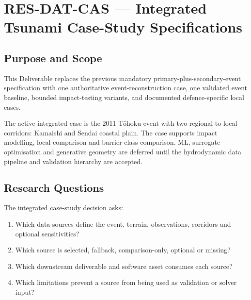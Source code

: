 
\section{RES-DAT-CAS --- Integrated Tsunami Case-Study Specifications}
\label{sec:res-dat-cas}

\subsection{Purpose and Scope}
\label{sec:res-dat-cas-purpose}

This Deliverable replaces the previous mandatory primary-plus-secondary-event
specification with one authoritative event-reconstruction case, one validated
event baseline, bounded impact-testing variants, and documented
defence-specific local cases.

The active integrated case is the 2011 Tōhoku event with two
regional-to-local corridors: Kamaishi and Sendai coastal plain. The
case supports impact modelling, local comparison and barrier-class
comparison. ML, surrogate optimisation and generative geometry are
deferred until the hydrodynamic data pipeline and validation hierarchy
are accepted.

\subsection{Research Questions}
\label{sec:res-dat-cas-research-questions}

The integrated case-study decision asks:

\begin{enumerate}
  \item Which data sources define the event, terrain, observations,
    corridors and optional sensitivities?
  \item Which source is selected, fallback, comparison-only,
    optional or missing?
  \item Which downstream deliverable and software asset consumes each
    source?
  \item Which limitations prevent a source from being used as
    validation or solver input?
\end{enumerate}

